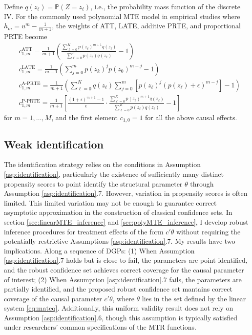 \documentclass[11pt]{article}
\theoremstyle{definition}
\newcommand{\Prob}{\ensuremath{\mathbb{P}}} %
\newcommand{\0}{\ensuremath{\mathbf{0}}}
\begin{document}
\begin{bibunit}
Define $q(z_\ell) = \Prob(Z=z_\ell)$, i.e., the probability mass function of the discrete IV. For the commonly used polynomial MTE model in empirical studies where $h_m = u^{m} - \frac{1}{m+1}$, the weights of ATT, LATE, additive PRTE, and proportional PRTE become
{
\begin{align*}
	&c^{\text{ATT}}_{1,m} = \frac{1}{m+1} \left(\frac{\sum_{\ell=0}^K p(z_\ell)^{m+1} q(z_\ell)}{\sum_{\ell=0}^K p(z_\ell)q(z_\ell)} - 1\right)\\
	&c^{\text{LATE}}_{1,m} = \frac{1}{m+1} \left(\sum_{j=0}^m p(z_k)^j p(z_0)^{m-j} - 1\right)\\
        &c^{\text{A-PRTE}}_{1,m} = \frac{1}{m+1} \left(\sum_{\ell = 0}^K q(z_\ell) \sum_{j = 0}^m \left[p(z_\ell)^{j} (p(z_\ell) + \epsilon)^{m-j}\right] - 1 \right) \\
        &c^{\text{P-PRTE}}_{1,m} = \frac{1}{m+1} \left[\frac{(1+\epsilon)^{m+1} - 1}{\epsilon} \cdot \frac{\sum_{\ell = 0}^K p(z_\ell)^{m+1} q(z_\ell)}{\sum_{\ell = 0}^K p(z_\ell) q(z_\ell)} - 1\right]
\end{align*}
}
for $m = 1,\ldots,M$, and the first element $c_{1,0} = 1$ for all the above causal effects.

\subsection{Weak identification}
The identification strategy relies on the conditions in Assumption \ref{asp:identification}, particularly the existence of sufficiently many distinct propensity scores to point identify the structural parameter $\theta$ through Assumption \ref{asp:identification}.7. However, variation in propensity scores is often limited. This limited variation may not be enough to guarantee correct asymptotic approximation in the construction of classical confidence sets. In section \ref{sec:linearMTE_inference} and \ref{sec:polyMTE_inference}, I develop robust inference procedures for treatment effects of the form $c'\theta$ without requiring the potentially restrictive Assumptions \ref{asp:identification}.7. My results have two implications. Along a sequence of DGPs: (1) When Assumption \ref{asp:identification}.7 holds but is close to fail, the parameters are point identified, and the robust confidence set achieves correct coverage for the causal parameter of interest; (2) When Assumption \ref{asp:identification}.7 fails, the parameters are partially identified, and the proposed robust confidence set mantains correct coverage of the causal parameter $c'\theta$, where $\theta$ lies in the set defined by the linear system \eqref{eq:mateq}. Additionally, this uniform validity result does not rely on Assumption \ref{asp:identification}.6, though this assumption is typically satisfied under researchers' common specifications of the MTR functions.


\end{bibunit}
\end{document}
